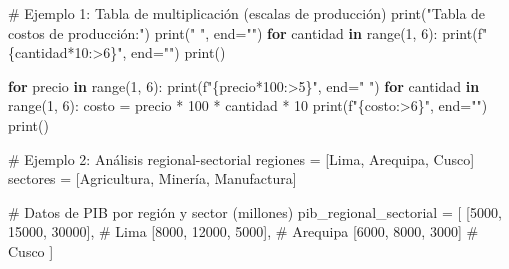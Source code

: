 \documentclass[
  doc,
  floatsintext,
  longtable,
  a4paper,
  nolmodern,
  notxfonts,
  notimes,
  12pt,
  colorlinks=true,linkcolor=blue,citecolor=blue,urlcolor=blue]{apa7}
\newenvironment{Shaded}{\begin{snugshade}}{\end{snugshade}}
\newcommand{\BuiltInTok}[1]{\textcolor[rgb]{0.00,0.23,0.31}{#1}}
\newcommand{\CommentTok}[1]{\textcolor[rgb]{0.37,0.37,0.37}{#1}}
\newcommand{\ControlFlowTok}[1]{\textcolor[rgb]{0.00,0.23,0.31}{\textbf{#1}}}
\newcommand{\DecValTok}[1]{\textcolor[rgb]{0.68,0.00,0.00}{#1}}
\newcommand{\KeywordTok}[1]{\textcolor[rgb]{0.00,0.23,0.31}{\textbf{#1}}}
\newcommand{\NormalTok}[1]{\textcolor[rgb]{0.00,0.23,0.31}{#1}}
\newcommand{\OperatorTok}[1]{\textcolor[rgb]{0.37,0.37,0.37}{#1}}
\newcommand{\SpecialCharTok}[1]{\textcolor[rgb]{0.37,0.37,0.37}{#1}}
\newcommand{\SpecialStringTok}[1]{\textcolor[rgb]{0.13,0.47,0.30}{#1}}
\newcommand{\StringTok}[1]{\textcolor[rgb]{0.13,0.47,0.30}{#1}}
\begin{document}
\begin{Shaded}
\begin{Highlighting}[]
\CommentTok{\# Ejemplo 1: Tabla de multiplicación (escalas de producción)}
\BuiltInTok{print}\NormalTok{(}\StringTok{"Tabla de costos de producción:"}\NormalTok{)}
\BuiltInTok{print}\NormalTok{(}\StringTok{"     "}\NormalTok{, end}\OperatorTok{=}\StringTok{""}\NormalTok{)}
\ControlFlowTok{for}\NormalTok{ cantidad }\KeywordTok{in} \BuiltInTok{range}\NormalTok{(}\DecValTok{1}\NormalTok{, }\DecValTok{6}\NormalTok{):}
    \BuiltInTok{print}\NormalTok{(}\SpecialStringTok{f"}\SpecialCharTok{\{}\NormalTok{cantidad}\OperatorTok{*}\DecValTok{10}\SpecialCharTok{:\textgreater{}6\}}\SpecialStringTok{"}\NormalTok{, end}\OperatorTok{=}\StringTok{""}\NormalTok{)}
\BuiltInTok{print}\NormalTok{()}

\ControlFlowTok{for}\NormalTok{ precio }\KeywordTok{in} \BuiltInTok{range}\NormalTok{(}\DecValTok{1}\NormalTok{, }\DecValTok{6}\NormalTok{):}
    \BuiltInTok{print}\NormalTok{(}\SpecialStringTok{f"}\SpecialCharTok{\{}\NormalTok{precio}\OperatorTok{*}\DecValTok{100}\SpecialCharTok{:\textgreater{}5\}}\SpecialStringTok{"}\NormalTok{, end}\OperatorTok{=}\StringTok{" "}\NormalTok{)}
    \ControlFlowTok{for}\NormalTok{ cantidad }\KeywordTok{in} \BuiltInTok{range}\NormalTok{(}\DecValTok{1}\NormalTok{, }\DecValTok{6}\NormalTok{):}
\NormalTok{        costo }\OperatorTok{=}\NormalTok{ precio }\OperatorTok{*} \DecValTok{100} \OperatorTok{*}\NormalTok{ cantidad }\OperatorTok{*} \DecValTok{10}
        \BuiltInTok{print}\NormalTok{(}\SpecialStringTok{f"}\SpecialCharTok{\{}\NormalTok{costo}\SpecialCharTok{:\textgreater{}6\}}\SpecialStringTok{"}\NormalTok{, end}\OperatorTok{=}\StringTok{""}\NormalTok{)}
    \BuiltInTok{print}\NormalTok{()}

\CommentTok{\# Ejemplo 2: Análisis regional{-}sectorial}
\NormalTok{regiones }\OperatorTok{=}\NormalTok{ [}\StringTok{\textquotesingle{}Lima\textquotesingle{}}\NormalTok{, }\StringTok{\textquotesingle{}Arequipa\textquotesingle{}}\NormalTok{, }\StringTok{\textquotesingle{}Cusco\textquotesingle{}}\NormalTok{]}
\NormalTok{sectores }\OperatorTok{=}\NormalTok{ [}\StringTok{\textquotesingle{}Agricultura\textquotesingle{}}\NormalTok{, }\StringTok{\textquotesingle{}Minería\textquotesingle{}}\NormalTok{, }\StringTok{\textquotesingle{}Manufactura\textquotesingle{}}\NormalTok{]}

\CommentTok{\# Datos de PIB por región y sector (millones)}
\NormalTok{pib\_regional\_sectorial }\OperatorTok{=}\NormalTok{ [}
\NormalTok{    [}\DecValTok{5000}\NormalTok{, }\DecValTok{15000}\NormalTok{, }\DecValTok{30000}\NormalTok{],  }\CommentTok{\# Lima}
\NormalTok{    [}\DecValTok{8000}\NormalTok{, }\DecValTok{12000}\NormalTok{, }\DecValTok{5000}\NormalTok{],   }\CommentTok{\# Arequipa}
\NormalTok{    [}\DecValTok{6000}\NormalTok{, }\DecValTok{8000}\NormalTok{, }\DecValTok{3000}\NormalTok{]     }\CommentTok{\# Cusco}
\NormalTok{]}


\end{Highlighting}
\end{Shaded}
\end{document}
